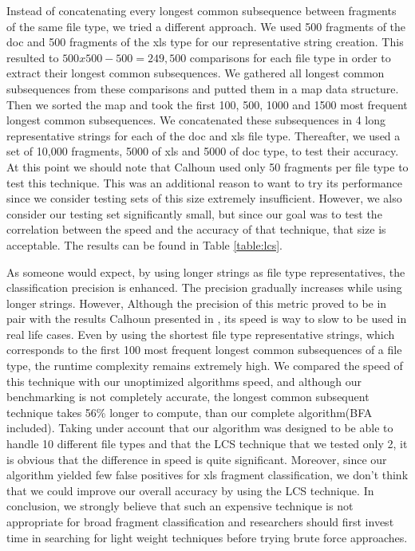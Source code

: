  Instead of concatenating every longest common subsequence between fragments of the same file type, we tried a different approach. We used 500 fragments of the doc and 500 fragments of the xls type for our representative string creation. This resulted to $500x500 - 500 = 249,500$ comparisons for each file type in order to extract their longest common subsequences. We gathered all longest common subsequences from these comparisons and putted them in a map data structure. Then we sorted the map and took the first 100, 500, 1000 and 1500 most frequent longest common subsequences. We concatenated these subsequences in 4 long representative strings for each of the doc and xls file type. Thereafter, we used a set of 10,000 fragments, 5000 of xls and 5000 of doc type, to test their accuracy. At this point we should note that Calhoun used only 50 fragments per file type to test this technique. This was an additional reason to want to try its performance since we consider testing sets of this size extremely insufficient. However, we also consider our testing set significantly small, but since our goal was to test the correlation between the speed and the accuracy of that technique, that size is acceptable. The results can be found in Table \ref{table:lcs}.
 


As someone would expect, by using longer strings as file type representatives, the classification precision is enhanced. The precision gradually increases while using longer strings. However, Although the precision of this metric proved to be in pair with the results Calhoun presented in \cite{Calhoun}, its speed is way to slow to be used in real life cases. Even by using the shortest file type representative strings, which corresponds to the first 100 most frequent longest common subsequences of a file type, the runtime complexity remains extremely high. We compared the speed of this technique with our unoptimized algorithms speed, and although our benchmarking is not completely accurate, the longest common subsequent technique takes 56\% longer to compute, than our complete algorithm(BFA included). Taking under account that our algorithm was designed to be able to handle 10 different file types and that the LCS technique that we tested only 2, it is obvious that the difference in speed is quite significant. Moreover, since our algorithm yielded few false positives for xls fragment classification, we don't think that we could improve our overall accuracy by using the LCS technique. In conclusion, we strongly believe that such an expensive technique is not appropriate for broad fragment classification and researchers should first invest time in searching for light weight techniques before trying brute force approaches. 
 


